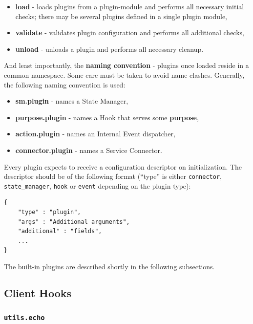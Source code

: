 \documentclass[a4paper]{article}
\begin{document}
\begin{itemize}
\item \textbf{load} - loads plugins from a plugin-module and performs all necessary initial checks; there may be several plugins defined in a single plugin module,
\item \textbf{validate} - validates plugin configuration and performs all additional checks,
\item \textbf{unload} - unloads a plugin and performs all necessary cleanup.
\end{itemize}

\noindent
And least importantly, the \textbf{naming convention} - plugins once loaded reside in a common namespace. Some care must be taken to avoid name clashes. Generally, the following naming convention is used:


\begin{itemize}
\item \textbf{sm.plugin} - names a State Manager,
\item \textbf{purpose.plugin} - names a Hook that serves some \textbf{purpose},
\item \textbf{action.plugin} - names an Internal Event dispatcher,
\item \textbf{connector.plugin} - names a Service Connector.
\end{itemize}

\noindent
Every plugin expects to receive a configuration descriptor on initialization. The descriptor should be of the following format (``type'' is either \texttt{connector}, \texttt{state\_manager}, \texttt{hook} or \texttt{event} depending on the plugin type):


\begin{verbatim}
{
    "type" : "plugin",
    "args" : "Additional arguments",
    "additional" : "fields",
    ...
}
\end{verbatim}




\noindent
The built-in plugins are described shortly in the following subsections.
\subsection{Client Hooks}
\label{sec-9-2}
\label{ref-hooks}
\subsubsection{\texttt{utils.echo}}
\label{sec-9-2-1}
\end{document}
